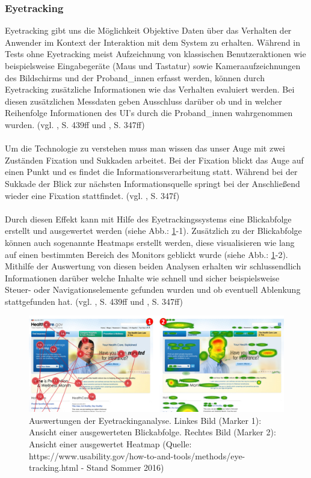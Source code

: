 \documentclass[Bachelorarbeit.tex]{subfiles}
\begin{document}
\subsubsection{Eyetracking}
\label{Eyetracking}

Eyetracking gibt uns die Möglichkeit Objektive Daten über das Verhalten der Anwender im Kontext der Interaktion mit dem System zu erhalten.
Während in Tests ohne Eyetracking meist Aufzeichnung von klassischen Benutzeraktionen wie beispielsweise Eingabegeräte (Maus und Tastatur) sowie Kameraaufzeichnungen des Bildschirms und der Proband\_innen erfasst werden, können durch Eyetracking zusätzliche Informationen wie das Verhalten evaluiert werden.
Bei diesen zusätzlichen Messdaten geben Ausschluss darüber ob und in welcher Reihenfolge Informationen des \ac{UI}'s durch die Proband\_innen wahrgenommen wurden. (vgl. \cite{Niegemann2008}, S. 439ff und \cite{Burmester}, S. 347ff)\\
\\
Um die Technologie zu verstehen muss man wissen das unser Auge mit zwei Zuständen Fixation und Sukkaden arbeitet.
Bei der Fixation blickt das Auge auf einen Punkt und es findet die Informationsverarbeitung statt. 
Während bei der Sukkade der Blick zur nächsten Informationsquelle springt bei der Anschließend wieder eine Fixation stattfindet. (vgl. \cite{Burmester}, S. 347f)\\
\\
Durch diesen Effekt kann mit Hilfe des Eyetrackingssystems eine Blickabfolge erstellt und ausgewertet werden (siehe Abb.: \ref{fig:Eyetracking}-1).
Zusätzlich zu der Blickabfolge können auch sogenannte Heatmaps erstellt werden, diese visualisieren wie lang auf einen bestimmten Bereich des Monitors geblickt wurde (siehe Abb.: \ref{fig:Eyetracking}-2).
Mithilfe der Auswertung von diesen beiden Analysen erhalten wir schlussendlich Informationen darüber welche Inhalte wie schnell und sicher beispielsweise Steuer- oder Navigationselemente gefunden wurden und ob eventuell Ablenkung stattgefunden hat. (vgl. \cite{Niegemann2008}, S. 439ff und \cite{Burmester}, S. 347ff)


\begin{figure}[H]
\centering
\includegraphics[width=1\linewidth]{img/Evaluation/Eyetracking}
\caption[Auswertungen der Eyetrackinganalyse]{Auswertungen der Eyetrackinganalyse. Linkes Bild (Marker 1): Ansicht einer ausgewerteten Blickabfolge. Rechtes Bild (Marker 2): Ansicht einer ausgewertet Heatmap (Quelle: https://www.usability.gov/how-to-and-tools/methods/eye-tracking.html - Stand Sommer 2016)}
\label{fig:Eyetracking}
\end{figure}
\end{document}
